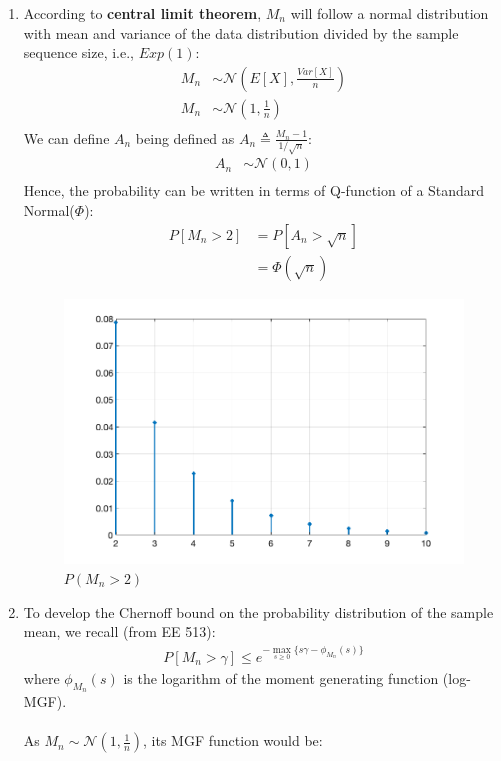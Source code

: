 \documentclass[12pt, letterpaper]{scrartcl}
\begin{document}
\begin{enumerate}[((a))]
    \item According to \textbf{central limit theorem}, $M_n$ will follow a normal distribution with mean and variance of the data distribution divided by the sample sequence size, i.e., $Exp(1)$:
    \begin{align*}
        M_n&\sim \mathcal{N}(E[X], \frac{Var[X]}{n})\\
        M_n&\sim \mathcal{N}(1, \frac{1}{n})\\
    \end{align*}
    We can define $A_n$ being defined as $A_n\triangleq\frac{M_n-1}{1/\sqrt{n}}$:
    \begin{align*}
        A_n&\sim \mathcal{N}(0, 1)\\
    \end{align*}
    Hence, the probability can be written in terms of Q-function of a Standard Normal($\Phi$):
    \begin{align*}
        P[M_n>2]&=P[A_n>\sqrt{n}]\\
        &=\Phi(\sqrt{n})
    \end{align*}
    \begin{figure}[H]
        \includegraphics[width=0.6\linewidth]{hw2_figures/2.1a.png}
        \centering
        \caption{$P(M_n>2)$}
    \end{figure}
    \item To develop the Chernoff bound on the probability distribution of the sample mean, we recall (from EE 513):
    \begin{align*}
        P[M_n>\gamma]\leq e^{-\max\limits_{s\geq 0}\{s\gamma-\phi_{M_n}(s)\}}
    \end{align*}
    where $\phi_{M_n}(s)$ is the logarithm of the moment generating function (log-MGF).\\\\
    As $M_n\sim \mathcal{N}(1, \frac{1}{n})$, its MGF function would be:
    \begin{align*}

\end{align*}
\end{enumerate}
\end{document}
